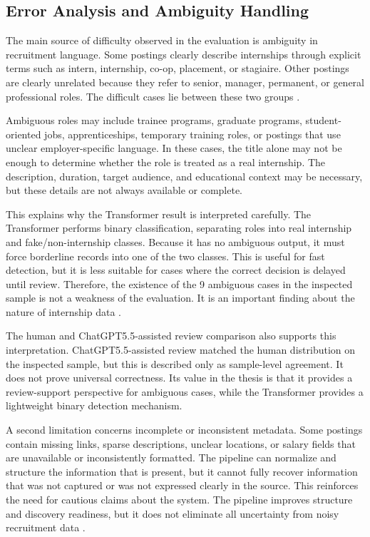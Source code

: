\subsection{Error Analysis and Ambiguity Handling}

The main source of difficulty observed in the evaluation is ambiguity in recruitment
language. Some postings clearly describe internships through explicit terms such as intern,
internship, co-op, placement, or stagiaire. Other postings are clearly unrelated because they
refer to senior, manager, permanent, or general professional roles. The difficult cases lie
between these two groups \cite{krippendorff2004content}.

Ambiguous roles may include trainee programs, graduate programs, student-oriented jobs,
apprenticeships, temporary training roles, or postings that use unclear employer-specific
language. In these cases, the title alone may not be enough to determine whether the role
is treated as a real internship. The description, duration, target audience, and
educational context may be necessary, but these details are not always available or complete.

This explains why the Transformer result is interpreted carefully. The Transformer
performs binary classification, separating roles into real internship and fake/non-internship
classes. Because it has no ambiguous output, it must force borderline records into one of the
two classes. This is useful for fast detection, but it is less suitable for cases where the correct
decision is delayed until review. Therefore, the existence of the 9 ambiguous cases in
the inspected sample is not a weakness of the evaluation. It is an important finding about the
nature of internship data \cite{sokolova2009systematic, krippendorff2004content}.

The human and ChatGPT5.5-assisted review comparison also supports this interpretation.
ChatGPT5.5-assisted review matched the human distribution on the inspected sample, but
this is described only as sample-level agreement. It does not prove universal
correctness. Its value in the thesis is that it provides a review-support perspective for
ambiguous cases, while the Transformer provides a lightweight binary detection mechanism.

A second limitation concerns incomplete or inconsistent metadata. Some postings contain
missing links, sparse descriptions, unclear locations, or salary fields that are unavailable or
inconsistently formatted. The pipeline can normalize and structure the information that is
present, but it cannot fully recover information that was not captured or was not expressed
clearly in the source. This reinforces the need for cautious claims about the system. The
pipeline improves structure and discovery readiness, but it does not eliminate all uncertainty
from noisy recruitment data \cite{batini2009methodologies, doan2012principles}.

